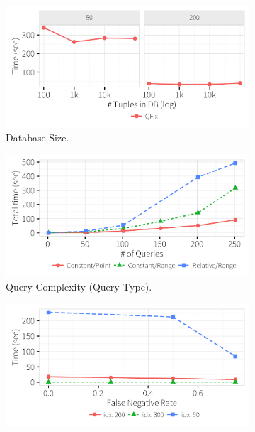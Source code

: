   \begin{figure}[h]
    \vspace*{-.1in}
    \centering
     \begin{subfigure}[t]{.3\textwidth}
      \includegraphics[width = .99\columnwidth]{figures/dbsize_time}
      \vspace*{-.2in}
      \caption{Database Size.}
      \label{f:dbsize_time} 
    \end{subfigure}
        \begin{subfigure}[t]{.3\textwidth}
      \includegraphics[width = .99\columnwidth]{figures/pointrelv_time}
      \vspace*{-.2in}
      \caption{Query Complexity (Query Type).}
      \label{f:qidx_time} 
    \end{subfigure}
    \begin{subfigure}[t]{.3\textwidth}
    \includegraphics[width = .99\columnwidth]{figures/noise_fn_time}

\end{subfigure}
\end{figure}
